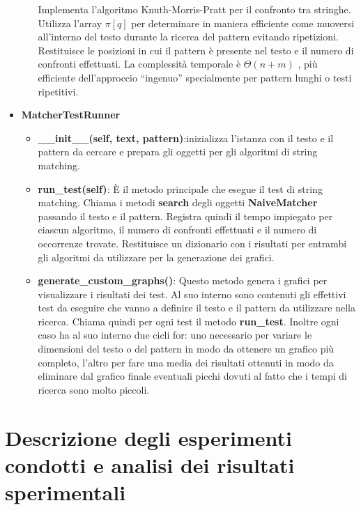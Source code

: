 \documentclass{article}
\begin{document}
\begin{itemize}
\begin{itemize}
        Implementa l'algoritmo Knuth-Morris-Pratt per il confronto tra stringhe. Utilizza l'array $\pi[q]$ per determinare in maniera efficiente come muoversi all'interno del testo durante la ricerca del pattern evitando ripetizioni.
        Restituisce le posizioni in cui il pattern è presente nel testo e il numero di confronti effettuati.
        La complessità temporale è $\Theta(n + m)$ , più efficiente dell'approccio ``ingenuo'' specialmente per pattern lunghi o testi ripetitivi.
    \end{itemize}
    \item \textbf{MatcherTestRunner}
    \begin{itemize}
        \item \textbf{\_\_init\_\_(self, text, pattern)}:inizializza l'istanza con il testo e il pattern da cercare e prepara gli oggetti per gli algoritmi di string matching.
        \item \textbf{run\_test(self)}: È il metodo principale che esegue il test di string matching. Chiama i metodi \textbf{search} degli oggetti \textbf{NaiveMatcher} passando il testo e il pattern. Registra quindi il tempo impiegato per ciascun algoritmo, il numero di confronti effettuati e il numero di occorrenze trovate. Restituisce un dizionario con i risultati per entrambi gli algoritmi da utilizzare per la generazione dei grafici.
        \item \textbf{generate\_custom\_graphs()}: Questo metodo genera i grafici per visualizzare i risultati dei test. Al suo interno sono contenuti gli effettivi test da eseguire che vanno a definire il testo e il pattern da utilizzare nella ricerca. Chiama quindi per ogni test il metodo \textbf{run\_test}. Inoltre ogni caso ha al suo interno due cicli for: uno necessario per variare le dimensioni del testo o del pattern in modo da ottenere un grafico più completo, l'altro per fare una media dei risultati ottenuti in modo da eliminare dal grafico finale eventuali picchi dovuti al fatto che i tempi di ricerca sono molto piccoli.
    \end{itemize}
\end{itemize}

\newpage

\section{Descrizione degli esperimenti condotti e analisi dei risultati sperimentali}
\end{document}
